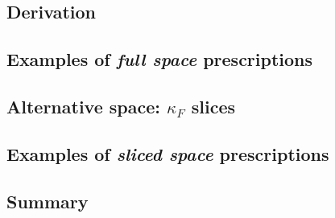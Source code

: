 


\subsection{Derivation}
\label{sec:mhou/prescr/deriv}


\subsection{Examples of \textit{full space} prescriptions}
\label{sec:mhou/prescr/main-ex}


\subsection{Alternative space: $\kappa_F$ slices}
\label{sec:mhou/prescr/slices}


\subsection{Examples of \textit{sliced space} prescriptions}
\label{sec:mhou/prescr/slices-ex}


\subsection{Summary}
\label{sec:mhou/prescr/recap}

